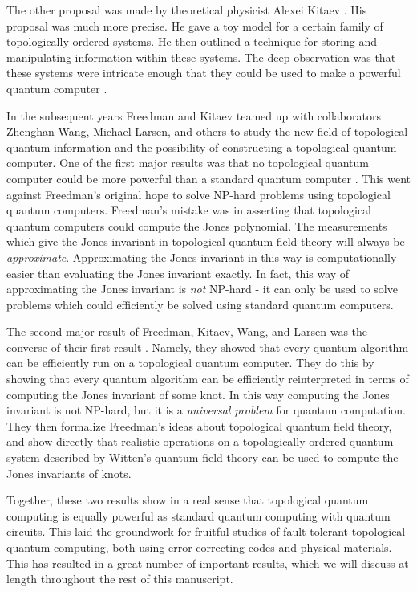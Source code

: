 The other proposal was made by theoretical physicist Alexei Kitaev \cite{kitaev2003fault}. His proposal was much more precise. He gave a toy model for a certain family of topologically ordered systems. He then outlined a technique for storing and manipulating information within these systems. The deep observation was that these systems were intricate enough that they could be used to make a powerful quantum computer \cite{mochon2003anyons}.

In the subsequent years Freedman and Kitaev teamed up with collaborators Zhenghan Wang, Michael Larsen, and others to study the new field of topological quantum information and the possibility of constructing a topological quantum computer. One of the first major results was that no topological quantum computer could be more powerful than a standard quantum computer \cite{freedman2002simulation}. This went against Freedman’s original hope to solve NP-hard problems using topological quantum computers. Freedman’s mistake was in asserting that topological quantum computers could compute the Jones polynomial. The measurements which give the Jones invariant in topological quantum field theory will always be \textit{approximate}. Approximating the Jones invariant in this way is computationally easier than evaluating the Jones invariant exactly. In fact, this way of approximating the Jones invariant is \textit{not} NP-hard - it can only be used to solve problems which could efficiently be solved using standard quantum computers.

The second major result of Freedman, Kitaev, Wang, and Larsen was the converse of their first result \cite{freedman2002modular}. Namely, they showed that every quantum algorithm can be efficiently run on a topological quantum computer. They do this by showing that every quantum algorithm can be efficiently reinterpreted in terms of computing the Jones invariant of some knot. In this way computing the Jones invariant is not NP-hard, but it is a \textit{universal problem} for quantum computation. They then formalize Freedman’s ideas about topological quantum field theory, and show directly that realistic operations on a topologically ordered quantum system described by Witten’s quantum field theory can be used to compute the Jones invariants of knots.

Together, these two results show in a real sense that topological quantum computing is equally powerful as standard quantum computing with quantum circuits. This laid the groundwork for fruitful studies of fault-tolerant topological quantum computing, both using error correcting codes and physical materials. This has resulted in a great number of important results, which we will discuss at length throughout the rest of this manuscript.


